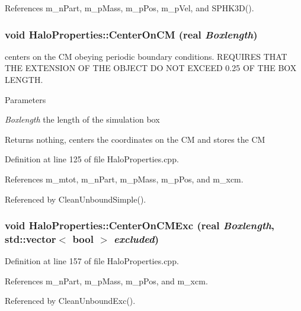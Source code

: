 References m\_\-nPart, m\_\-pMass, m\_\-pPos, m\_\-pVel, and SPHK3D().

\subsubsection[{CenterOnCM}]{\setlength{\rightskip}{0pt plus 5cm}void HaloProperties::CenterOnCM ({\bf real} {\em Boxlength})}\label{classHaloProperties_a4a3489a22ccd05f8d1119d4a2337d053}
centers on the CM obeying periodic boundary conditions. REQUIRES THAT THE EXTENSION OF THE OBJECT DO NOT EXCEED 0.25 OF THE BOX LENGTH. 
\begin{DoxyParams}{Parameters}
\item[{\em Boxlength}]the length of the simulation box \end{DoxyParams}
\begin{DoxyReturn}{Returns}
nothing, centers the coordinates on the CM and stores the CM 
\end{DoxyReturn}


Definition at line 125 of file HaloProperties.cpp.



References m\_\-mtot, m\_\-nPart, m\_\-pMass, m\_\-pPos, and m\_\-xcm.



Referenced by CleanUnboundSimple().

\subsubsection[{CenterOnCMExc}]{\setlength{\rightskip}{0pt plus 5cm}void HaloProperties::CenterOnCMExc ({\bf real} {\em Boxlength}, \/  std::vector$<$ bool $>$ {\em excluded})}\label{classHaloProperties_a9149e0a3d5ca614566b15e4d0bf59e96}


Definition at line 157 of file HaloProperties.cpp.



References m\_\-nPart, m\_\-pMass, m\_\-pPos, and m\_\-xcm.



Referenced by CleanUnboundExc().

